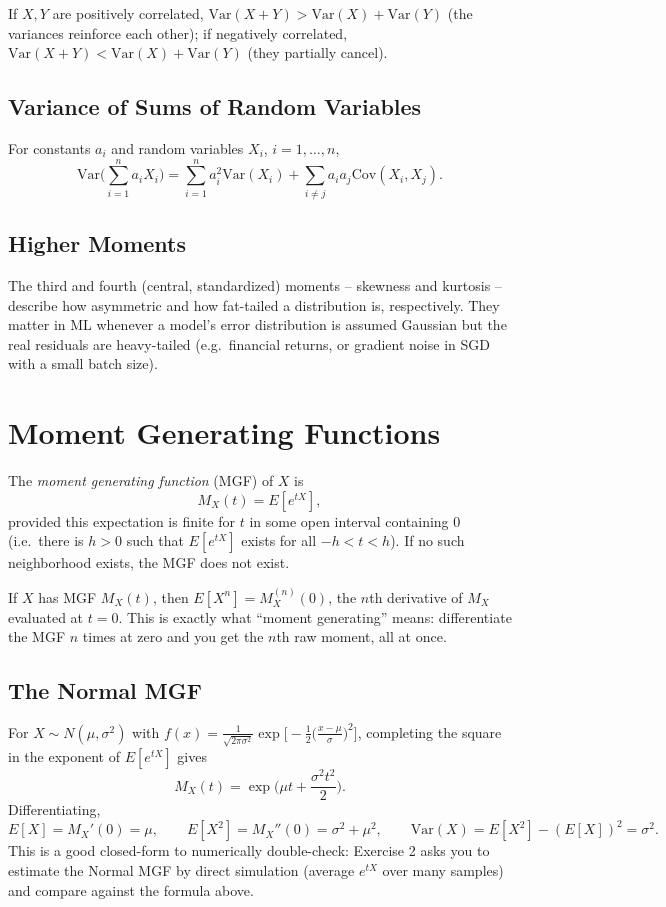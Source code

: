 \documentclass[11pt]{article}
\begin{document}
If $X, Y$ are positively correlated, $\mathrm{Var}(X+Y) >
\mathrm{Var}(X)+\mathrm{Var}(Y)$ (the variances reinforce each other); if
negatively correlated, $\mathrm{Var}(X+Y) < \mathrm{Var}(X)+\mathrm{Var}(Y)$
(they partially cancel).

\subsection{Variance of Sums of Random Variables}
For constants $a_i$ and random variables $X_i$, $i=1,\dots,n$,
\[
  \mathrm{Var}\Big(\sum_{i=1}^n a_i X_i\Big)
  = \sum_{i=1}^n a_i^2 \mathrm{Var}(X_i) + \sum_{i \ne j} a_i a_j
  \mathrm{Cov}(X_i, X_j).
\]

\subsection{Higher Moments}
The third and fourth (central, standardized) moments -- skewness and
kurtosis -- describe how asymmetric and how fat-tailed a distribution is,
respectively. They matter in ML whenever a model's error distribution is
assumed Gaussian but the real residuals are heavy-tailed (e.g.\ financial
returns, or gradient noise in SGD with a small batch size).

\section{Moment Generating Functions}

\begin{definition}
The \emph{moment generating function} (MGF) of $X$ is
\[
  M_X(t) = E[e^{tX}],
\]
provided this expectation is finite for $t$ in some open interval containing
0 (i.e.\ there is $h>0$ such that $E[e^{tX}]$ exists for all $-h<t<h$). If no
such neighborhood exists, the MGF does not exist.
\end{definition}

\begin{theorem}
If $X$ has MGF $M_X(t)$, then $E[X^n] = M_X^{(n)}(0)$, the $n$th derivative
of $M_X$ evaluated at $t=0$. This is exactly what ``moment generating''
means: differentiate the MGF $n$ times at zero and you get the $n$th raw
moment, all at once.
\end{theorem}

\subsection{The Normal MGF}
For $X \sim N(\mu, \sigma^2)$ with $f(x) = \frac{1}{\sqrt{2\pi\sigma^2}}
\exp\big[-\tfrac{1}{2}\big(\tfrac{x-\mu}{\sigma}\big)^2\big]$, completing the
square in the exponent of $E[e^{tX}]$ gives
\[
  M_X(t) = \exp\Big(\mu t + \frac{\sigma^2 t^2}{2}\Big).
\]
Differentiating,
\[
  E[X] = M_X'(0) = \mu, \qquad
  E[X^2] = M_X''(0) = \sigma^2 + \mu^2, \qquad
  \mathrm{Var}(X) = E[X^2] - (E[X])^2 = \sigma^2.
\]
This is a good closed-form to numerically double-check: Exercise 2 asks you
to estimate the Normal MGF by direct simulation (average $e^{tX}$ over many
samples) and compare against the formula above.
\end{document}
